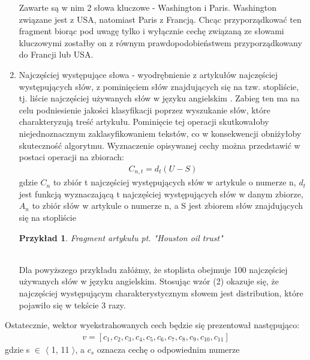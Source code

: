 \documentclass{classrep}
\newtheorem{exmp}{Przykład}[section]
\begin{document}
\begin{enumerate}
    Zawarte są w nim 2 słowa kluczowe - Washington i Paris. Washington związane jest z USA, natomiast Paris z Francją. Chcąc przyporządkować ten fragment biorąc pod uwagę tylko i wyłącznie cechę związaną ze słowami kluczowymi zostałby on z równym prawdopodobieństwem przyporządkowany do Francji lub USA. 
    \item Najczęściej występujące słowa - wyodrębnienie z artykułów najczęściej występujących słów, z pominięciem słów znajdujących się na tzw. stopliście, tj. liście najczęściej używanych słów w języku angielskim \cite{reuters}. Zabieg ten ma na celu podniesienie jakości klasyfikacji poprzez wyszukanie słów, które charakteryzują treść artykułu. Pominięcie tej operacji skutkowałoby niejednoznacznym zaklasyfikowaniem tekstów, co w konsekwencji obniżyłoby skuteczność algorytmu. 
	Wyznaczenie opisywanej cechy można przedstawić w postaci operacji na zbiorach:
	\begin{gather}
	C_{n, t}= d_{t}(U - S)
	\end{gather} 
	\indent gdzie $C_{n}$ to zbiór t najczęściej występujących słów w artykule o numerze n, 
	$d_{t}$ jest funkcją wyznaczającą t najczęściej występujących słów w danym zbiorze, $A_{n}$ to zbiór słów w artykule o numerze n, 
	a S jest zbiorem słów znajdujących się na stopliście \\
	\begin{exmp}
    Fragment artykułu pt. "Houston oil trust"  \cite{coca_words} \\
		 \\
    \end{exmp} 
    Dla powyższego przykładu załóżmy, że stoplista obejmuje 100 najczęściej używanych słów w języku angielskim. Stosując wzór (2) okazuje się, że najczęściej występującym charakterystycznym słowem jest distribution, które pojawiło się w tekście 3 razy. \\
\end{enumerate}
Ostatecznie, wektor wyekstrahowanych cech będzie się prezentował następująco: 
\begin{gather}
v = [c_{1}, c_{2}, c_{3}, c_{4}, c_{5}, c_{6}, c_{7}, c_{8}, c_{9}, c_{10}, c_{11}] 
\end{gather}
gdzie s $\in$ $\langle$ 1, 11 $\rangle$, a $c_{s}$ oznacza cechę o odpowiednim numerze \cite{tadeusiewicz90}
\end{document}
